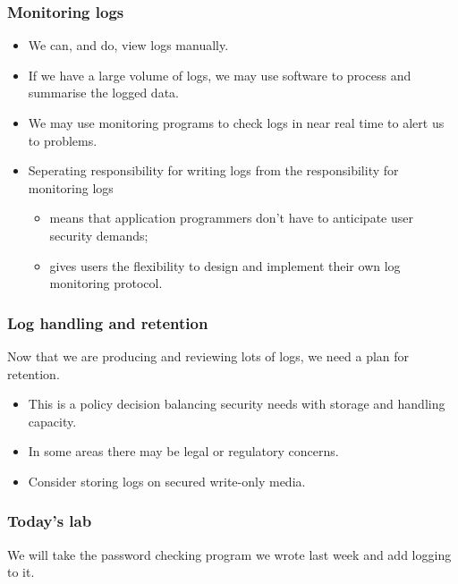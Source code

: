 \documentclass[10pt]{beamer}
\begin{document}
\begin{frame}
  \frametitle{Monitoring  logs}

 \begin{itemize}
  \item We can, and do, view logs manually.
  \item If we have a large volume of logs, we may use software to process and summarise the logged data.
  \item We may use monitoring programs to check logs in near real time to alert us to problems.
  \item Seperating responsibility for writing logs from the responsibility for monitoring logs
	  \begin{itemize}
		  \item means that application programmers don't have to anticipate user security demands;
		  \item gives users the flexibility to design and implement their own log monitoring protocol.
          \end{itemize}
  \end{itemize}
\end{frame}


\begin{frame}
  \frametitle{Log handling and retention}

 Now that we are producing and reviewing lots of logs, we need a plan for retention.
 \begin{itemize}
  \item This is a policy decision balancing security needs with storage and handling capacity.
  \item In some areas there may be legal or regulatory concerns.
  \item Consider storing logs on secured write-only media.
  \end{itemize}
\end{frame}


\begin{frame}
  \frametitle{Today's lab}

  We will take the password checking program we wrote last week and add logging to it.
\end{frame}
\end{document}
